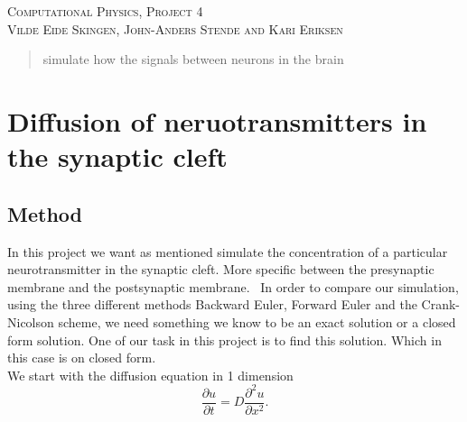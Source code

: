 \documentclass[a4paper,12pt, english]{article}
\begin{document}
\begin{titlepage}
\begin{center}
\textsc{\Large Computational Physics, Project 4}\\[0.5cm]
\textsc{Vilde Eide Skingen, John-Anders Stende and Kari Eriksen}\\[0.5cm]

\end{center}
\end{titlepage}

\begin{abstract}

simulate how the signals between neurons in the brain 

\end{abstract}

\section*{Diffusion of neruotransmitters in the synaptic cleft}

\subsection*{Method}

In this project we want as mentioned simulate the concentration of a particular neurotransmitter in the synaptic cleft. More specific between the presynaptic membrane and the postsynaptic membrane. \
In order to compare our simulation, using the three different methods Backward Euler, Forward Euler and the Crank-Nicolson scheme, we need something we know to be an exact solution or a closed form solution. One of our task in this project is to find this solution. Which in this case is on closed form. 
\\
We start with the diffusion equation in 1 dimension
\\
\begin{equation}
\frac{\partial u}{\partial t} = D\frac{\partial^2 u}{\partial x^2}.
\label{eq:diffusion_1d}
\end{equation}	
\\
\end{document}
